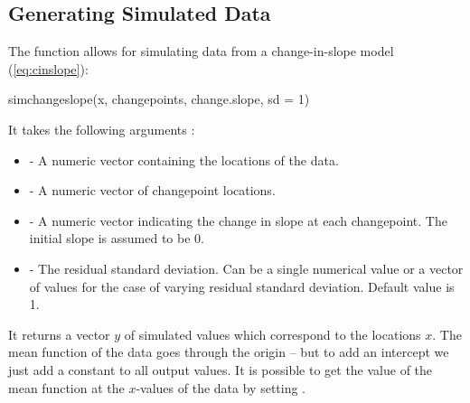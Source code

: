 \documentclass[nojss]{jss}
\begin{document}
\subsection{Generating Simulated Data}
%
%
The  function allows for simulating data from a change-in-slope model (\ref{eq:cinslope}): %
\begin{CodeInput}
simchangeslope(x, changepoints, change.slope, sd = 1)
\end{CodeInput}
%
%
It takes the following arguments :
\begin{itemize}
\item {} -  A numeric vector containing the locations of the data.
\item {} - A numeric vector of changepoint locations.
\item {} -  A numeric vector indicating the change in slope at each changepoint. The initial slope is assumed to be 0.
\item {} - The residual standard deviation. Can be a single numerical value or a vector of values for the case of varying residual standard deviation. Default value is 1.
\end{itemize}
%
%
It returns a vector $y$ of simulated values which correspond to the locations $x$. 
%
%
The mean function of the data goes through the origin -- but to add an intercept we just add a constant to all output values. It is possible to get the value of the mean function at the $x$-values of the data by setting .
\end{document}
